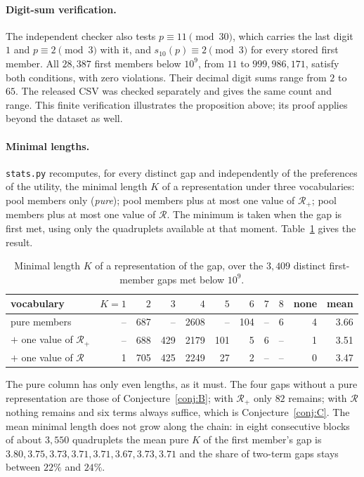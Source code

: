 \documentclass[11pt,a4paper]{article}
\newcommand{\R}{\mathcal{R}}
\newcommand{\Radd}{\mathcal{R}_{+}}
\newcommand{\code}[1]{\texttt{#1}}
\begin{document}
\paragraph{Digit-sum verification.}
The independent checker also tests $p\equiv11\pmod{30}$, which carries
the last digit $1$ and $p\equiv2\pmod3$ with it, and
$s_{10}(p)\equiv2\pmod3$ for every stored first member.
All $28{,}387$ first members below $10^9$, from $11$ to $999{,}986{,}171$,
satisfy both conditions, with zero violations. Their decimal digit sums
range from $2$ to $65$. The released CSV was checked separately and gives
the same count and range. This finite verification illustrates the
proposition above; its proof applies beyond the dataset as well.

\paragraph{Minimal lengths.}
\code{stats.py} recomputes, for every distinct gap and independently of the
preferences of the utility, the minimal length $K$ of a representation
under three vocabularies: pool members only (\emph{pure}); pool members
plus at most one value of $\Radd$; pool members plus at most one value of
$\R$. The minimum is taken when the gap is first met, using only the
quadruplets available at that moment. Table~\ref{tab:K} gives the result.

\begin{table}[ht]
\centering
\caption{Minimal length $K$ of a representation of the gap, over the
$3{,}409$ distinct first-member gaps met below $10^9$.}
\label{tab:K}
\small
\begin{tabular}{lrrrrrrrrrr}
\toprule
vocabulary & $K{=}1$ & $2$ & $3$ & $4$ & $5$ & $6$ & $7$ & $8$ & none & mean \\
\midrule
pure members            & --   & 687  & --   & 2608  & --  & 104 & --  & 6  & 4  & 3.66 \\
$+$ one value of $\Radd$  & --   & 688  & 429  & 2179  & 101 & 5   & 6   & -- & 1  & 3.51 \\
$+$ one value of $\R$     & 1    & 705  & 425  & 2249  & 27  & 2   & --  & -- & 0  & 3.47 \\
\bottomrule
\end{tabular}
\end{table}

The pure column has only even lengths, as it must. The four gaps without a
pure representation are those of Conjecture~\ref{conj:B}; with $\Radd$
only $82$ remains; with $\R$ nothing remains and six terms always suffice,
which is Conjecture~\ref{conj:C}. The mean minimal length
does not grow along the chain: in eight consecutive blocks of about
$3{,}550$ quadruplets the mean pure $K$ of the first member's gap is
$3.80, 3.75, 3.73, 3.71, 3.71, 3.67, 3.73, 3.71$ and the share of two-term
gaps stays between $22\%$ and $24\%$.
\end{document}
